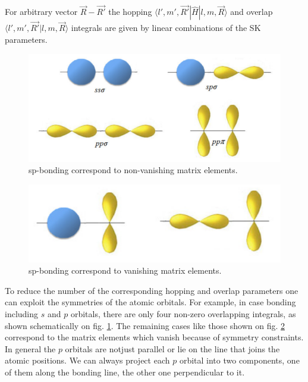 For arbitrary vector $\vec{R} - \vec{R'} $ the hopping $\langle l', m', \vec{R'} | \hat{H} | l,m,\vec{R} \rangle$ and overlap $\langle l', m', \vec{R'} | l,m,\vec{R} \rangle$ integrals are given by linear combinations of the SK parameters. 

\begin{figure}[h]  \label{fig:sp}
  \includegraphics[width=\linewidth]{img/sp_bonding}
  \caption[caption]{sp-bonding correspond to non-vanishing matrix elements.\footnotemark}
\end{figure}
\begin{figure}[h]  \label{fig:sp_vanishing}
  \includegraphics[width=\linewidth]{img/sp_vanishing}
  \caption[caption]{sp-bonding correspond to vanishing matrix elements.\footnotemark}
\end{figure}

To reduce the number of the corresponding hopping and overlap parameters one can exploit the symmetries of the atomic orbitals. For example, in case bonding including $s$ and $p$ orbitals, there are only four non-zero overlapping integrals, as shown schematically on fig. \ref{fig:sp}. The remaining cases like those shown on fig. \ref{fig:sp_vanishing} correspond to the matrix elements which vanish because of symmetry constraints. In general the $p$ orbitals are notjust parallel or lie on the line that joins the atomic positions. We can always project each $p$ orbital into two components, one of them along the bonding line, the other one perpendicular to it. 

